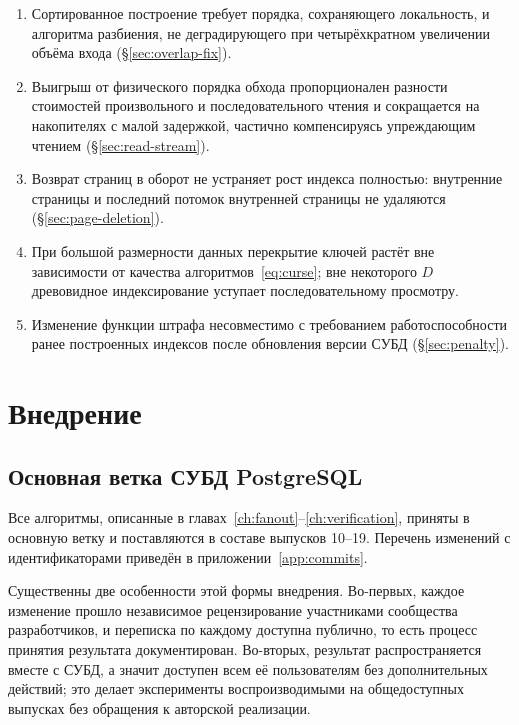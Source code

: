\begin{enumerate}
\item Сортированное построение требует порядка, сохраняющего локальность, и
      алгоритма разбиения, не деградирующего при четырёхкратном увеличении
      объёма входа (§\ref{sec:overlap-fix}).
\item Выигрыш от физического порядка обхода пропорционален разности стоимостей
      произвольного и последовательного чтения и сокращается на накопителях с
      малой задержкой, частично компенсируясь упреждающим чтением
      (§\ref{sec:read-stream}).
\item Возврат страниц в оборот не устраняет рост индекса полностью: внутренние
      страницы и последний потомок внутренней страницы не удаляются
      (§\ref{sec:page-deletion}).
\item При большой размерности данных перекрытие ключей растёт вне зависимости от
      качества алгоритмов~\eqref{eq:curse}; вне некоторого $D$ древовидное
      индексирование уступает последовательному просмотру.
\item Изменение функции штрафа несовместимо с требованием работоспособности
      ранее построенных индексов после обновления версии СУБД
      (§\ref{sec:penalty}).
\end{enumerate}

\section{Внедрение}

\subsection{Основная ветка СУБД PostgreSQL}

Все алгоритмы, описанные в главах~\ref{ch:fanout}--\ref{ch:verification},
приняты в основную ветку \pg{} и поставляются в составе выпусков 10--19.
Перечень изменений с идентификаторами приведён в
приложении~\ref{app:commits}.

Существенны две особенности этой формы внедрения. Во-первых, каждое изменение
прошло независимое рецензирование участниками сообщества разработчиков, и
переписка по каждому доступна публично, то есть процесс принятия результата
документирован. Во-вторых, результат распространяется вместе с СУБД, а значит
доступен всем её пользователям без дополнительных действий; это делает
эксперименты воспроизводимыми на общедоступных выпусках без обращения к
авторской реализации.

